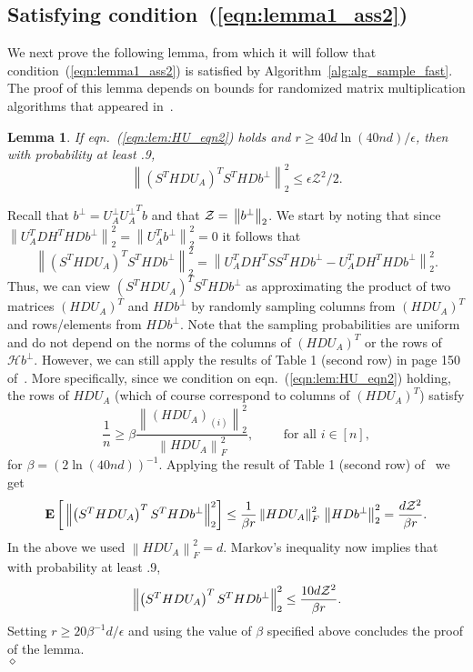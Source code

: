 \documentclass[11pt]{article}
\newcommand{\Expect}[1]{\mbox{}{\bf{E}}\left[#1\right]}
\newcommand{\FNormS}[1]{\mbox{}\left\|#1\right\|_F^2}
\newcommand{\VTTNorm }[1]{\mbox{}\left\|#1\right\|_2  }
\newcommand{\VTTNormS}[1]{\mbox{}\left\|#1\right\|_2^2}
\newtheorem{lemma}{Lemma}
\newenvironment{Proof}{\noindent {\em Proof:}}{\\\hspace*{\fill}\mbox{$\diamond$}}
\begin{document}
\subsection{Satisfying condition~(\ref{eqn:lemma1_ass2})}

We next prove the following lemma, from which it will follow that condition~(\ref{eqn:lemma1_ass2}) is satisfied by Algorithm~\ref{alg:alg_sample_fast}. The proof of this lemma depends on bounds for randomized matrix multiplication algorithms that appeared in~\cite{dkm_matrix1}.

\begin{lemma}
\label{lem:sample_lem40pf}
If eqn.~(\ref{eqn:lem:HU_eqn2}) holds and $r \geq 40d\ln(40nd)/\epsilon$, then with probability at least .9,
$$\VTTNormS{
\left(S^THDU_A\right)^{T}S^THDb^{\perp}
} \leq \epsilon \mathcal{Z}^{2}/2.$$
\end{lemma}
\begin{Proof}
Recall that $b^{\perp} = U_A^{\perp}{U_A^{\perp}}^{T}b$ and that ${\cal Z} = \VTTNorm{b^{\perp}}$. We start by noting that since
$\VTTNormS{U_A^TDH^THDb^{\perp}}=\VTTNormS{U_A^Tb^{\perp}}=0$ it follows that
$$
 \VTTNormS{ \left(S^THDU_A\right)^{T}S^THDb^{\perp} }
   = \VTTNormS{U_A^TDH^TSS^THDb^{\perp}
             - U_A^TDH^THDb^{\perp}}    .
$$
Thus, we can view $\left(S^THDU_A\right)^{T}S^THDb^{\perp}$ as approximating the product of two matrices $\left(HDU_A\right)^{T}$ and $HDb^{\perp}$ by randomly sampling columns from $\left(HDU_A\right)^T$ and rows/elements from $HDb^{\perp}$. Note that the sampling probabilities are uniform and do not depend on the norms of the columns of $\left(HDU_A\right)^{T}$ or the rows of $\mathcal{H}b^{\perp}$. However, we can still apply the results of Table 1 (second row) in page 150 of~\cite{dkm_matrix1}. More specifically, since we condition on eqn.~(\ref{eqn:lem:HU_eqn2}) holding, the rows of $HDU_A$ (which of course correspond to columns of $\left(HDU_A\right)^T$) satisfy
\begin{equation}
\frac{1}{n}   \ge  \beta \frac{\VTTNormS{\left(HDU_A\right)_{(i)}}}{\FNormS{HDU_A}}, \qquad       \text{ for all } i \in [n],
\end{equation}
for $\beta = \left(2\ln(40nd)\right)^{-1}$. Applying the result of Table 1 (second row) of~\cite{dkm_matrix1} we get
\begin{equation*}
\Expect{ \VTTNormS{\left(S^THDU_A\right)^{T}S^THDb^{\perp}
} }
   \leq \frac{1}{\beta r}\FNormS{HDU_A}\VTTNormS{HDb^{\perp}}
   =     \frac{d{\cal Z}^2}{\beta r}.
\end{equation*}
In the above we used $\FNormS{HDU_A} = d$. Markov's inequality now implies that with probability at least .9,
\begin{equation*}
\VTTNormS{\left(S^THDU_A\right)^{T}S^THDb^{\perp}
} \leq \frac{10d{\cal Z}^2}{\beta r}.
\end{equation*}
Setting $r \geq 20\beta^{-1}d/\epsilon$ and using the value of $\beta$ specified above concludes the proof of the lemma.
\end{Proof}
\end{document}
